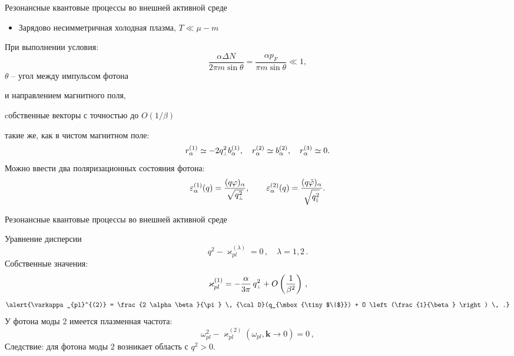 \documentclass{beamer}
\def\mprp{\mbox{\tiny $\bot$}}
\def\mprl{\mbox{\tiny $\|$}}
\newcommand{\bs}{\boldsymbol}
\begin{document}
\begin{frame}{Резонансные квантовые процессы во внешней активной среде}
\begin{center}
\begin{itemize}
\item Зарядово несимметричная холодная плазма, $T \ll \mu - m$
\end{itemize}
При выполнении условия: $$\frac{\alpha \Delta N}{2 \pi m \sin{\theta}} = \frac{\alpha p_F}{\pi m \sin{\theta}} \ll 1,$$
$\theta$ -- угол между импульсом фотона 

и направлением магнитного поля,

\vspace*{2mm}
cобственные векторы с точностью до $O(1/\beta)$ 

такие же, как в чистом магнитном поле:
$$r_\alpha^{(1)} \simeq -2q_{\mprp}^2 b_\alpha^{(1)}, \quad r_\alpha^{(2)} \simeq b_\alpha^{(2)}, \quad r_\alpha^{(3)} \simeq 0.$$
Можно ввести два поляризационных состояния фотона:
$$\varepsilon_\alpha^{(1)}(q) = \frac{(q \varphi)_\alpha}{\sqrt{q_{\mprp}^2}},
\qquad
\varepsilon_\alpha^{(2)}(q) = \frac{(q \tilde \varphi)_\alpha}
{\sqrt{q_{\mprl}^2}}.$$
\end{center}
\end{frame}
\begin{frame}{Резонансные квантовые процессы во внешней активной среде}
\begin{center}
Уравнение дисперсии
%
$$q^2 - \varkappa_{pl}^{(\lambda)} = 0\, , \quad \lambda=1,2\,.$$
%
Собственные значения:
%
$$\varkappa_{pl}^{(1)} = - \frac{\alpha}{3\pi} \, 
q^2_{\mprp} + O \left (\frac{1}{\beta^2} \right)  \, ,$$
$$\alert{\varkappa_{pl}^{(2)} = \frac{2 \alpha\beta}{\pi} \, {\cal D}(q_{\mprl})  + 
 O \left (\frac{1}{\beta} \right) \, .}$$
У фотона моды 2 имеется плазменная частота:
$$\omega_{pl}^2 - \varkappa_{pl}^{(2)} (\omega_{pl}, {\bs k} \to 0) = 0\, ,$$
\alert{Следствие: для фотона моды $2$ возникает область с $q^2 > 0$.}
\end{center}
\end{frame}
\end{document}
